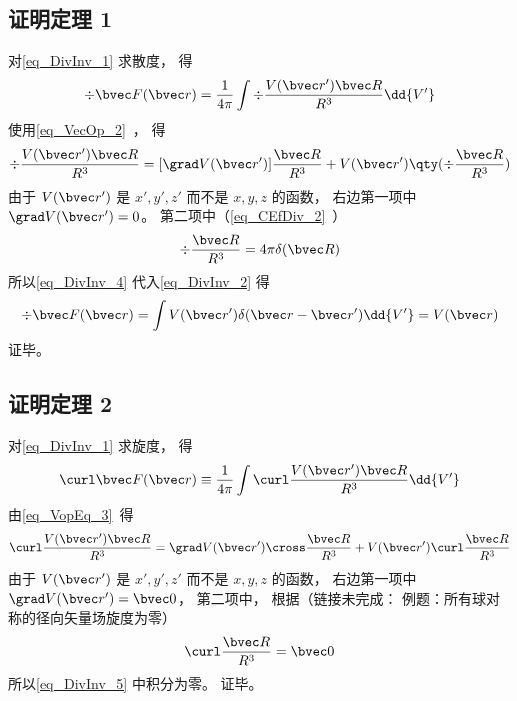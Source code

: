 \subsection{证明定理 1}
对\autoref{eq_DivInv_1} 求散度， 得
\begin{equation}\label{eq_DivInv_2}
\div \bvec F(\bvec r) = \frac{1}{4\pi}\int \div \frac{V(\bvec r') \bvec R}{R^3} \dd{V'}
\end{equation}
使用\autoref{eq_VecOp_2}~， 得
\begin{equation}\label{eq_DivInv_4}
\div \frac{V(\bvec r') \bvec R}{R^3} = [\grad V(\bvec r')] \frac{ \bvec R}{R^3} + V(\bvec r') \qty(\div \frac{\bvec R}{R^3})
\end{equation}
由于 $V(\bvec r')$ 是 $x', y', z'$ 而不是 $x, y, z$ 的函数， 右边第一项中 $\grad V(\bvec r') = 0$。 第二项中（\autoref{eq_CEfDiv_2}~）
\begin{equation}
\div \frac{\bvec R}{R^3} = 4\pi \delta(\bvec R)
\end{equation}
所以\autoref{eq_DivInv_4} 代入\autoref{eq_DivInv_2} 得
\begin{equation}
\div \bvec F(\bvec r) = \int V(\bvec r') \delta(\bvec r - \bvec r') \dd{V'} = V(\bvec r)
\end{equation}
证毕。

\subsection{证明定理 2}
对\autoref{eq_DivInv_1} 求旋度， 得
\begin{equation}\label{eq_DivInv_5}
\curl \bvec F(\bvec r) \equiv \frac{1}{4\pi}\int \curl \frac{V(\bvec r') \bvec R}{R^3} \dd{V'}
\end{equation}
由\autoref{eq_VopEq_3}~得
\begin{equation}
\curl \frac{V(\bvec r') \bvec R}{R^3} = \grad V(\bvec r') \cross \frac{\bvec R}{R^3} + V(\bvec r') \curl \frac{\bvec R}{R^3}
\end{equation}
由于 $V(\bvec r')$ 是 $x', y', z'$ 而不是 $x, y, z$ 的函数， 右边第一项中 $\grad V(\bvec r') = \bvec 0$， 第二项中， 根据（链接未完成： 例题：所有球对称的径向矢量场旋度为零）
\begin{equation}
\curl \frac{\bvec R}{R^3} = \bvec 0
\end{equation}
所以\autoref{eq_DivInv_5} 中积分为零。 证毕。
